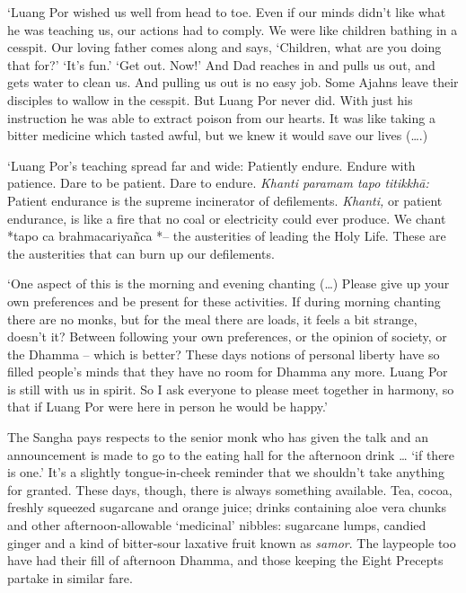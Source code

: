 `Luang Por wished us well from head to toe. Even if our minds didn't
like what he was teaching us, our actions had to comply. We were like
children bathing in a cesspit. Our loving father comes along and says, `Children, what are you doing that for?' `It's fun.' `Get out. Now!' And
Dad reaches in and pulls us out, and gets water to clean us. And pulling
us out is no easy job. Some Ajahns leave their disciples to wallow in
the cesspit. But Luang Por never did. With just his instruction he was
able to extract poison from our hearts. It was like taking a bitter
medicine which tasted awful, but we knew it would save our lives
 (\ldots{}.) 

`Luang Por's teaching spread far and wide: Patiently endure. Endure with
patience. Dare to be patient. Dare to endure. \emph{Khanti paramam tapo
titikkhā:} Patient endurance is the supreme incinerator of defilements. 
\emph{Khanti,} or patient endurance, is like a fire that no coal or
electricity could ever produce. We chant *tapo ca brahmacariyañca *--
the austerities of leading the Holy Life. These are the austerities that
can burn up our defilements. 

`One aspect of this is the morning and evening chanting (\ldots{}) 
Please give up your own preferences and be present for these activities. 
If during morning chanting there are no monks, but for the meal there
are loads, it feels a bit strange, doesn't it? Between following your
own preferences, or the opinion of society, or the Dhamma -- which is
better? These days notions of personal liberty have so filled people's
minds that they have no room for Dhamma any more. Luang Por is still
with us in spirit. So I ask everyone to please meet together in harmony, 
so that if Luang Por were here in person he would be happy.'

The Sangha pays respects to the senior monk who has given the talk and
an announcement is made to go to the eating hall for the afternoon drink
\ldots{} `if there is one.' It's a slightly tongue-in-cheek reminder
that we shouldn't take anything for granted. These days, though, there
is always something available. Tea, cocoa, freshly squeezed sugarcane
and orange juice; drinks containing aloe vera chunks and other
afternoon-allowable `medicinal' nibbles: sugarcane lumps, candied ginger
and a kind of bitter-sour laxative fruit known as \emph{samor}. The
laypeople too have had their fill of afternoon Dhamma, and those keeping
the Eight Precepts partake in similar fare. 

